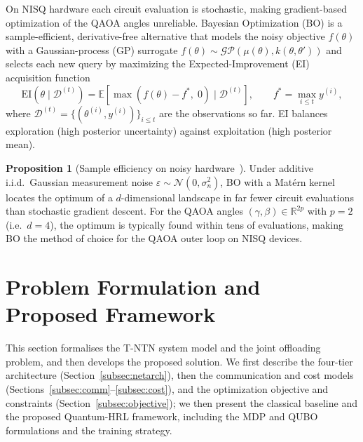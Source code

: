 \documentclass[11pt,a4paper]{article}
\theoremstyle{definition}
\newtheorem{proposition}{Proposition}[section]
\newcommand{\R}{\mathbb{R}}
\begin{document}
On NISQ hardware each circuit evaluation is stochastic, making gradient-based optimization of the QAOA angles unreliable. Bayesian Optimization (BO) is a sample-efficient, derivative-free alternative that models the noisy objective $f(\theta)$ with a Gaussian-process (GP) surrogate $f(\theta)\sim\mathcal{GP}(\mu(\theta),k(\theta,\theta'))$ and selects each new query by maximizing the Expected-Improvement (EI) acquisition function
\begin{equation}
  \mathrm{EI}\!\left(\theta \mid \mathcal{D}^{(t)}\right)
  = \mathbb{E}\!\left[\max\!\left(f(\theta) - f^*,\; 0\right) \mid \mathcal{D}^{(t)}\right],
  \qquad f^* = \max_{i \leq t} y^{(i)},
  \label{eq:ei_def}
\end{equation}
where $\mathcal{D}^{(t)}=\{(\theta^{(i)},y^{(i)})\}_{i\le t}$ are the observations so far. EI balances exploration (high posterior uncertainty) against exploitation (high posterior mean).

\begin{proposition}[Sample efficiency on noisy hardware~{\cite{bo_qaoa}}]
\label{prop:bo_efficiency}
Under additive i.i.d.\ Gaussian measurement noise $\varepsilon\sim\mathcal N(0,\sigma_n^2)$, BO with a Mat\'ern kernel locates the optimum of a $d$-dimensional landscape in far fewer circuit evaluations than stochastic gradient descent. For the QAOA angles $(\gamma,\beta)\in\R^{2p}$ with $p{=}2$ (i.e.\ $d{=}4$), the optimum is typically found within tens of evaluations, making BO the method of choice for the QAOA outer loop on NISQ devices.
\end{proposition}

\section{Problem Formulation and Proposed Framework}
\label{sec:problem}

This section formalises the T-NTN system model and the joint offloading problem, and then develops the proposed solution. We first describe the four-tier architecture (Section~\ref{subsec:netarch}), then the communication and cost models (Sections~\ref{subsec:comm}--\ref{subsec:cost}), and the optimization objective and constraints (Section~\ref{subsec:objective}); we then present the classical baseline and the proposed Quantum-HRL framework, including the MDP and QUBO formulations and the training strategy.
\end{document}
